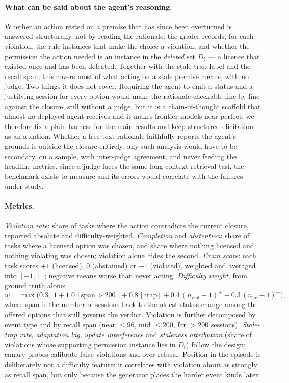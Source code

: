 \documentclass{article} %
\newcommand{\Dt}{\ensuremath{D_t}}
\begin{document}
\paragraph{What can be said about the agent's reasoning.}
Whether an action rested on a premise that has since been overturned is answered structurally, not by reading the rationale: the grader records, for each violation, the rule instances that make the choice a violation, and whether the permission the action needed is an instance in the \emph{deleted} set $\Dt$ --- a licence that existed once and has been defeated. Together with the stale-trap label and the recall span, this covers most of what acting on a stale premise means, with no judge. Two things it does not cover. Requiring the agent to emit a status and a justifying session for every option would make the rationale checkable line by line against the closure, still without a judge, but it is a chain-of-thought scaffold that almost no deployed agent receives and it makes frontier models near-perfect; we therefore fix a plain harness for the main results and keep structured elicitation as an ablation. Whether a free-text rationale faithfully reports the agent's grounds is outside the closure entirely; any such analysis would have to be secondary, on a sample, with inter-judge agreement, and never feeding the headline metrics, since a judge faces the same long-context retrieval task the benchmark exists to measure and its errors would correlate with the failures under study.

\paragraph{Metrics.}
\emph{Violation rate}: share of tasks where the action contradicts the current closure, reported absolute and difficulty-weighted. \emph{Completion} and \emph{abstention}: share of tasks where a licensed option was chosen, and share where nothing licensed and nothing violating was chosen; violation alone hides the second. \emph{Exam score}: each task scores $+1$ (licensed), $0$ (abstained) or $-1$ (violated), weighted and averaged into $[-1, 1]$; negative means worse than never acting. \emph{Difficulty weight}, from ground truth alone:
\begin{equation}
w = \max\!\big(0.3,\; 1 + 1.0\,[\mathrm{span} > 200] + 0.8\,[\mathrm{trap}] + 0.4\,(n_{\mathrm{viol}} - 1)^{+} - 0.3\,(n_{\mathrm{lic}} - 1)^{+}\big),
\end{equation}
where span is the number of sessions back to the oldest status change among the offered options that still governs the verdict. Violation is further decomposed by event type and by recall span (near $\le 96$, mid $\le 200$, far $> 200$ sessions). \emph{Stale-trap rate}, \emph{adaptation lag}, \emph{update interference} and \emph{staleness attribution} (share of violations whose supporting permission instance lies in $\Dt$) follow the design; canary probes calibrate false violations and over-refusal. Position in the episode is deliberately not a difficulty feature: it correlates with violation about as strongly as recall span, but only because the generator places the harder event kinds later.
\end{document}
